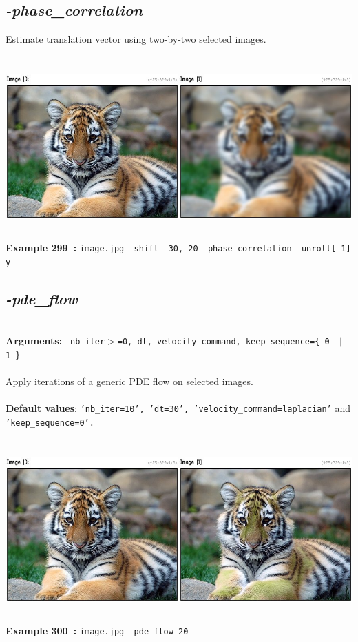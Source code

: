 \documentclass[a4paper,11pt,twoside]{book}
\begin{document}
\subsection{\emph{-phase\_correlation} }\vspace*{-0.5em}
Estimate translation vector using two-by-two selected images.
\begin{center}\includegraphics[keepaspectratio=true,height=7cm,width=\textwidth]{img/gmic_def299.jpg}\\
{\footnotesize \textbf{Example 299~:} \texttt{image.jpg --shift -30,-20 --phase\_correlation -unroll[-1] y}}
\end{center}

\subsection{\emph{-pde\_flow} }\vspace*{-0.5em}
~\\\textbf{Arguments: } 
{\small \texttt{\_nb\_iter$>$=0,\_dt,\_velocity\_command,\_keep\_sequence=\{ 0 ~$|$~ 1 \}}}\\~\\
Apply iterations of a generic PDE flow on selected images.
~\\~\\\textbf{Default values}: {\small \texttt{'nb\_iter=10', 'dt=30', 'velocity\_command=laplacian'} and \texttt{'keep\_sequence=0'.}}
\begin{center}\includegraphics[keepaspectratio=true,height=7cm,width=\textwidth]{img/gmic_def300.jpg}\\
{\footnotesize \textbf{Example 300~:} \texttt{image.jpg --pde\_flow 20}}
\end{center}
\end{document}
